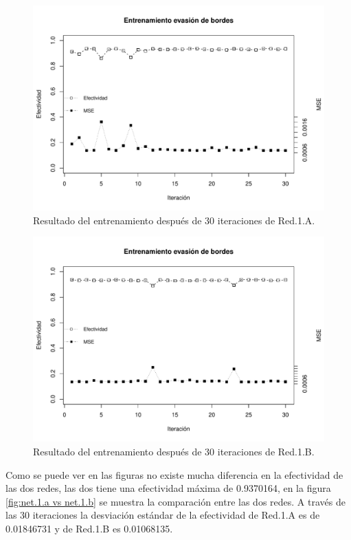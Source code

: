 \documentclass{iccmemoria}
\begin{document}
\begin{figure}
  \centering
  \includegraphics[width = 450pt]{images/plot_net_1_a.pdf}
  \caption[Entrenamiento primera etapa Red.1.A.]{Resultado del entrenamiento después de 30 iteraciones de Red.1.A.}
  \label{fig:net.1.a}
\end{figure}

\begin{figure}
  \centering
  \includegraphics[width = 450pt]{images/plot_net_1_b.pdf}
  \caption[Entrenamiento primera etapa Red.1.B.]{Resultado del entrenamiento después de 30 iteraciones de Red.1.B.}
  \label{fig:net.1.b}
\end{figure}

Como se puede ver en las figuras no existe mucha diferencia en la efectividad de las dos redes, las dos tiene una efectividad máxima de 0.9370164, en la figura \ref{fig:net.1.a vs net.1.b} se muestra la comparación entre las dos redes. A través de las 30 iteraciones la desviación estándar de la efectividad de Red.1.A es de 0.01846731 y de Red.1.B es 0.01068135.\\
\end{document}
